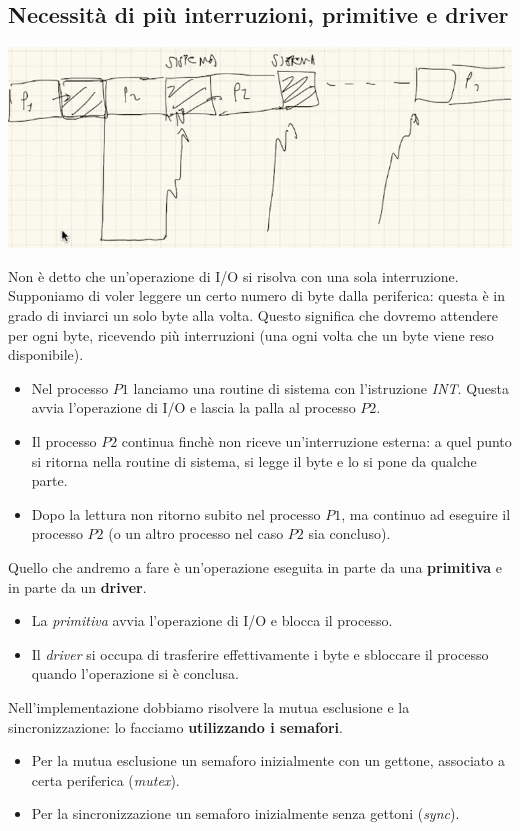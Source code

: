 \subsection{Necessità di più interruzioni, primitive e driver}
\begin{center}
	\includegraphics[scale=.7]{img/278.PNG}
\end{center}
Non è detto che un'operazione di I/O si risolva con una sola interruzione. Supponiamo di voler leggere un certo numero di byte dalla periferica: questa è in grado di inviarci un solo byte alla volta.  Questo significa che dovremo attendere per ogni byte, ricevendo più interruzioni (una ogni volta che un byte viene reso disponibile). 
\begin{itemize}
	\item Nel processo $P1$ lanciamo una routine di sistema con l'istruzione \emph{INT}. Questa avvia l'operazione di I/O e lascia la palla al processo $P2$.
	\item Il processo $P2$ continua finchè non riceve un'interruzione esterna: a quel punto si ritorna nella routine di sistema, si legge il byte e lo si pone da qualche parte.
	\item Dopo la lettura non ritorno subito nel processo $P1$, ma continuo ad eseguire il processo $P2$ (o un altro processo nel caso $P2$ sia concluso). 
\end{itemize} 
\begin{framed}
	\noindent Quello che andremo a fare è un'operazione eseguita in parte da una \textbf{primitiva} e in parte da un \textbf{driver}.
	\begin{itemize}
		\item La \emph{primitiva} avvia l'operazione di I/O e blocca il processo.
		\item Il \emph{driver} si occupa di trasferire effettivamente i byte e sbloccare il processo quando l'operazione si è conclusa.
	\end{itemize}
	Nell'implementazione dobbiamo risolvere la mutua esclusione e la sincronizzazione: lo facciamo \textbf{utilizzando i semafori}. 
	\begin{itemize}
		\item Per la mutua esclusione un semaforo inizialmente con un gettone, associato a certa periferica (\emph{mutex}).
		\item Per la sincronizzazione un semaforo inizialmente senza gettoni (\emph{sync}).
	\end{itemize} 
\end{framed}

